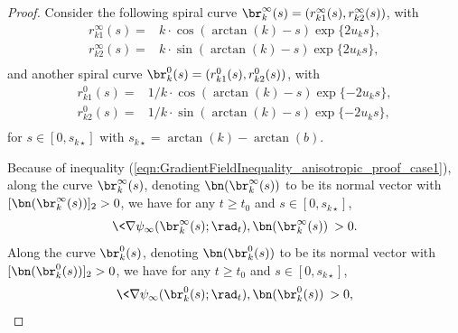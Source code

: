\documentclass[11pt]{article}
\begin{document}
\begin{proof}

Consider the following spiral curve $\br_k^\infty(s) = (r_{k1}^\infty(s), r_{k2}^\infty(s))$, with
\begin{equation}
\begin{aligned}
r_{k1}^\infty(s) =& k \cdot \cos(\arctan(k) - s) \exp\{ 2 u_k s \},\\
r_{k2}^\infty(s) =& k \cdot \sin(\arctan(k) - s) \exp\{ 2 u_k s \},\\
\end{aligned}
\end{equation}
and another spiral curve $\br_k^0(s) = (r_{k1}^0(s), r_{k2}^0(s))$, with
\begin{equation}
\begin{aligned}
r_{k1}^0(s) =& 1/k \cdot \cos(\arctan(k) - s) \exp\{ - 2 u_k s \},\\
r_{k2}^0(s) =& 1/k \cdot \sin(\arctan(k) - s) \exp\{ - 2 u_k s \},\\
\end{aligned}
\end{equation}
for $s \in [0, s_{k\star}]$ with $s_{k\star} = \arctan(k) - \arctan(b)$. 

Because of inequality (\ref{eqn:GradientFieldInequality_anisotropic_proof_case1}), along the curve $\br_k^\infty(s)$, denoting $\bn(\br_k^\infty(s))$ to be its normal vector with $[\bn(\br_k^\infty(s))]_2 > 0$, we have for any $t \ge t_0$ and $s \in [0, s_{k\star}]$, 
\begin{equation}\label{eqn:Boundary4_in_anisotropic_proof_case1}
\< \nabla \psi_\infty(\br_k^\infty(s); \rad_t), \bn(\br_k^\infty(s)) \> > 0.
\end{equation}
Along the curve $\br_k^0(s)$, denoting $\bn(\br_k^0(s))$ to be its normal vector with $[\bn(\br_k^0(s))]_2 > 0$, we have for any $t \ge t_0$ and $s \in [0, s_{k\star}]$,
\begin{equation}\label{eqn:Boundary3_in_anisotropic_proof_case1}
\< \nabla \psi_\infty(\br_k^0(s); \rad_t), \bn(\br_k^0(s)) \> > 0,
\end{equation}




\end{proof}
\end{document}
